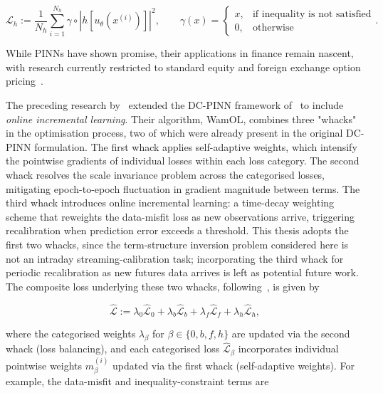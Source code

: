 \documentclass[11pt, a4paper]{article}
\begin{document}
\begin{equation} \label{eq:no-arbitrage-general}
    \mathcal{L}_h := \frac{1}{N_h}\sum_{i=1}^{N_h} \gamma \circ \left|h\left[u_\theta(x^{(i)})\right]\right|^2, \qquad
\gamma(x) = \begin{cases} x, & \text{if inequality is not satisfied} \\ 0, & \text{otherwise} \end{cases}.
\end{equation}

While PINNs have shown promise, their applications in finance remain nascent, with research currently restricted to standard equity and foreign exchange option pricing~\cite{Dhiman2023PhysicsPricing}. 

The preceding research by~\cite{Hoshisashi2024Whack-a-moleSurface} extended the DC-PINN framework of~\cite{Hoshisashi2024Physics-InformedPDEs} to include \textit{online incremental learning}. Their algorithm, WamOL, combines three "whacks" in the optimisation process, two of which were already present in the original DC-PINN formulation. The first whack applies self-adaptive weights, which intensify the pointwise gradients of individual losses within each loss category. The second whack resolves the scale invariance problem across the categorised losses, mitigating epoch-to-epoch fluctuation in gradient magnitude between terms. The third whack introduces online incremental learning: a time-decay weighting scheme that reweights the data-misfit loss as new observations arrive, triggering recalibration when prediction error exceeds a threshold. This thesis adopts the first two whacks, since the term-structure inversion problem considered here is not an intraday streaming-calibration task; incorporating the third whack for periodic recalibration as new futures data arrives is left as potential future work. The composite loss underlying these two whacks, following~\cite{Hoshisashi2024Physics-InformedPDEs}, is given by

\begin{equation}
    \hat{\mathcal{L}} := \lambda_0 \hat{\mathcal{L}}_0 + \lambda_b \hat{\mathcal{L}}_b + \lambda_f \hat{\mathcal{L}}_f + \lambda_h \hat{\mathcal{L}}_h,
    \label{eq:dcpinn-composite}
\end{equation}

where the categorised weights $\lambda_\beta$ for $\beta \in \{0, b, f, h\}$ are updated via the second whack (loss balancing), and each categorised loss $\hat{\mathcal{L}}_\beta$ incorporates individual pointwise weights $m_\beta^{(i)}$ updated via the first whack (self-adaptive weights). For example, the data-misfit and inequality-constraint terms are
\end{document}
